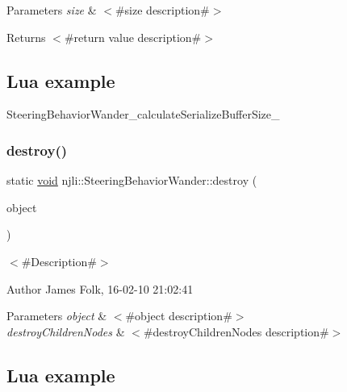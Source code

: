 \begin{DoxyParams}{Parameters}
{\em size} & $<$\#size description\#$>$\\
\hline
\end{DoxyParams}
\begin{DoxyReturn}{Returns}
$<$\#return value description\#$>$
\end{DoxyReturn}
\hypertarget{classnjli_1_1_steering_behavior_wander_ex1}{}\subsection{Lua example}\label{classnjli_1_1_steering_behavior_wander_ex1}

\begin{DoxyCodeInclude}
\end{DoxyCodeInclude}
Steering\+Behavior\+Wander\+\_\+calculate\+Serialize\+Buffer\+Size\+\_\+ \mbox{\label{classnjli_1_1_steering_behavior_wander_a1f94bb03833a999228808fbc8f1f2bbc}} 
\subsubsection{\texorpdfstring{destroy()}{destroy()}}
{\footnotesize\ttfamily static \mbox{\hyperlink{_thread_8h_af1e856da2e658414cb2456cb6f7ebc66}{void}} njli\+::\+Steering\+Behavior\+Wander\+::destroy (\begin{DoxyParamCaption}\item[{\mbox{\hyperlink{classnjli_1_1_steering_behavior_wander}{Steering\+Behavior\+Wander}} $\ast$}]{object }\end{DoxyParamCaption})\hspace{0.3cm}{\ttfamily [static]}}



$<$\#\+Description\#$>$ 

\begin{DoxyAuthor}{Author}
James Folk, 16-\/02-\/10 21\+:02\+:41
\end{DoxyAuthor}

\begin{DoxyParams}{Parameters}
{\em object} & $<$\#object description\#$>$ \\
\hline
{\em destroy\+Children\+Nodes} & $<$\#destroy\+Children\+Nodes description\#$>$\\
\hline
\end{DoxyParams}
\hypertarget{classnjli_1_1_steering_behavior_wander_ex1}{}\subsection{Lua example}\label{classnjli_1_1_steering_behavior_wander_ex1}

